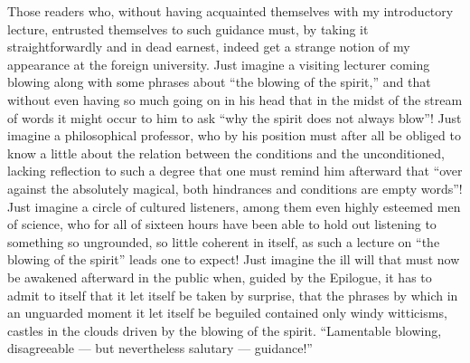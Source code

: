\documentclass[12pt]{book}
\newcommand{\opage}[1]{\marginnote{\footnotesize\textit{[#1]}}}
\begin{document}
Those readers who, without having acquainted themselves with my
introductory lecture, entrusted themselves to such guidance must, by
taking it straightforwardly and in dead earnest, indeed get a strange
notion of my appearance at the foreign university. Just imagine a
visiting lecturer coming blowing along with some phrases about ``the
blowing of the spirit,'' and that without even having so much going on in
his head that in the midst of the stream of words it might occur to him
to ask ``why the spirit does not always blow''! Just imagine a
philosophical professor, who by his position must after all be obliged
to know a little about the relation between the conditions and the
unconditioned, lacking reflection to such a degree that one must remind
him afterward that ``over against the absolutely magical, both hindrances
and conditions are empty words''! Just imagine a circle of cultured
listeners, among them even highly esteemed men of science, who for all of
sixteen hours have been able to hold out listening to something so
ungrounded,
\opage{313}\setcounter{footnote}{0}%
so little coherent in itself, as such a lecture on ``the blowing of the
spirit'' leads one to expect! Just imagine the ill will that must now be
awakened afterward in the public when, guided by the Epilogue, it has to
admit to itself that it let itself be taken by surprise, that the phrases
by which in an unguarded moment it let itself be beguiled contained only
windy witticisms, castles in the clouds driven by the blowing of the
spirit. ``Lamentable blowing, disagreeable --- but nevertheless
salutary --- guidance!''
\end{document}
